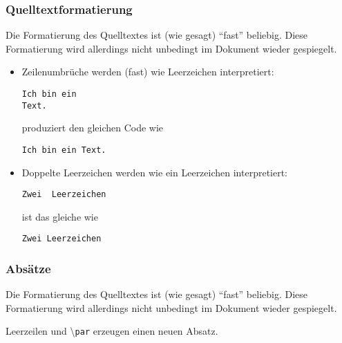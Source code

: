 \begin{frame}[fragile]
  \frametitle{Quelltextformatierung}

  \onslide<+->

  Die Formatierung des Quelltextes ist (wie gesagt) \enquote{fast} beliebig.  Diese
  Formatierung wird allerdings nicht unbedingt im Dokument wieder gespiegelt.

  \begin{itemize}
  \item<+-> Zeilenumbrüche werden (fast) wie Leerzeichen interpretiert:
\begin{lstlisting}
Ich bin ein
Text.
\end{lstlisting}
    produziert den gleichen Code wie
\begin{lstlisting}
Ich bin ein Text.
\end{lstlisting}
  \item<+-> Doppelte Leerzeichen werden wie ein Leerzeichen interpretiert:
\begin{lstlisting}[showspaces=true]
Zwei  Leerzeichen
\end{lstlisting}
ist das gleiche wie
\begin{lstlisting}[showspaces=true]
Zwei Leerzeichen
\end{lstlisting}
  \end{itemize}

\end{frame}

\begin{frame}
  \frametitle{Absätze}
  Die Formatierung des Quelltextes ist (wie gesagt) \enquote{fast} beliebig.  Diese
  Formatierung wird allerdings nicht unbedingt im Dokument wieder gespiegelt.
  \begin{description}
    \item Leerzeilen und \textbackslash\lstinline!par! erzeugen einen neuen Absatz.
  \end{description}
\end{frame}



